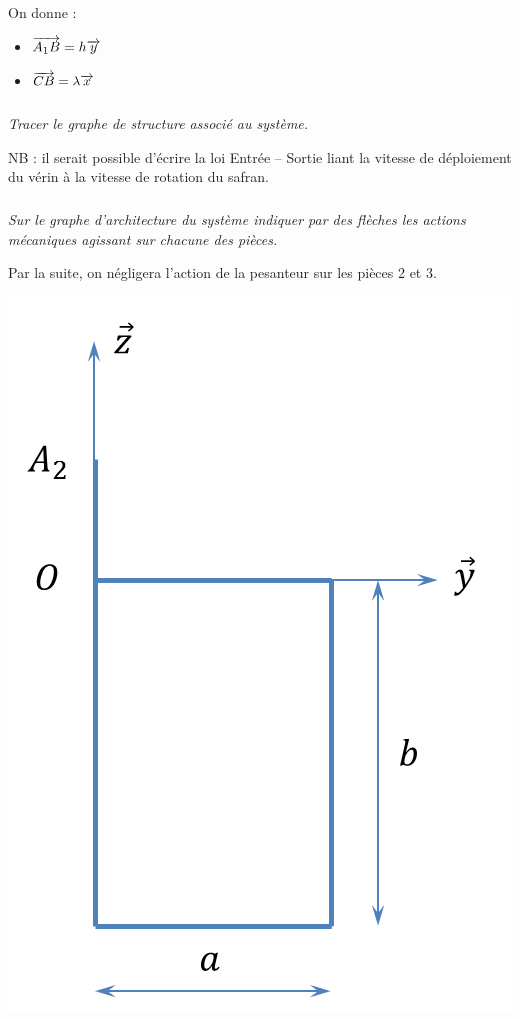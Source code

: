 \documentclass[10pt]{article}
\begin{document}
\begin{minipage}[c]{.6\linewidth}


On donne : 
\begin{itemize}
\item $\overrightarrow{A_1B}=h\overrightarrow{y}$
\item $\overrightarrow{CB}=\lambda\overrightarrow{x}$
\end{itemize}

\subparagraph{}
\textit{Tracer le graphe de structure associé au système.}

NB : il serait possible d'écrire la loi Entrée -- Sortie liant la vitesse de déploiement du vérin à la vitesse de rotation du safran.

\subparagraph{}
\textit{Sur le graphe d'architecture du système indiquer par des flèches les actions mécaniques agissant sur chacune des pièces.}

Par la suite, on négligera l'action de la pesanteur sur les pièces 2 et 3. 

\end{minipage} \hfill
\begin{minipage}[c]{.35\linewidth}
\begin{center}
\includegraphics[width=.8\linewidth]{images/safran3}
\end{center}
\end{minipage}
\end{document}

